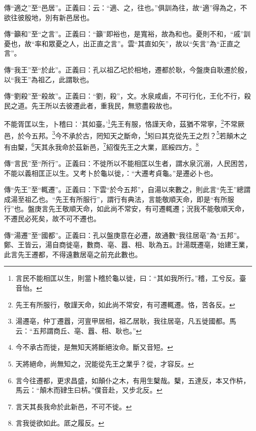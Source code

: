 {\noindent\zhuan{}\fzbyks 傳“適之”至“邑居”。正義曰：云：“適、之，往也。”俱訓為往，故“適”得為之，不欲往彼殷地，別有新邑居也。 \par}

{\noindent\zhuan{}\fzbyks 傳“籲和”至“之言”。正義曰：“籲”即裕也，是寬裕，故為和也。憂則不和，“戚”訓憂也，故“率和眾憂之人，出正直之言”。雲“其直如矢”，故以“矢言”為“正直之言”。 \par}

{\noindent\zhuan{}\fzbyks 傳“我王”至“於此”。正義曰：孔以祖乙圮於相地，遷都於耿，今盤庚自耿遷於殷，以“我王”為祖乙，此謂耿也。 \par}

{\noindent\zhuan{}\fzbyks 傳“劉殺”至“殺故”。正義曰：“劉，殺”，文。水泉咸鹵，不可行化，王化不行，殺民之道。先王所以去彼遷此者，重我民，無慾盡殺故也。 \par}

不能胥匡以生，卜稽曰：‘其如臺。’\footnote{言民不能相匡以生，則當卜稽於龜以徙，曰：“其如我所行。”稽，工兮反。臺音怡。}先王有服，恪謹天命，茲猶不常寧，\footnote{先王有所服行，敬謹天命，如此尚不常安，有可遷輒遷。恪，苦各反。}不常厥邑，於今五邦。\footnote{湯遷亳，仲丁遷囂，河亶甲居相，祖乙居耿，我往居亳，凡五徙國都。馬云：“五邦謂商丘、亳、囂、相、耿也。”}今不承於古，罔知天之斷命，\footnote{今不承古而徙，是無知天將斷絕汝命。斷又音短。}矧曰其克從先王之烈？\footnote{天將絕命，尚無知之，況能從先王之業乎？從，才容反。}若顛木之有由櫱，\footnote{言今往遷都，更求昌盛，如顛仆之木，有用生櫱哉。櫱，五達反，本又作枿，馬云：“顛木而肄生曰枿。”僕音赴，又步北反。}天其永我命於茲新邑，\footnote{言天其長我命於此新邑，不可不徙。}紹復先王之大業，厎綏四方。\footnote{言我徙欲如此。厎之履反。}

{\noindent\zhuan{}\fzbyks 傳“言民”至“所行”。正義曰：不徙所以不能相匡以生者，謂水泉沉溺，人民困苦，不能以義相匡正以生。又考卜於龜以徙，：“大遷考貞龜。”是遷必卜也。 \par}

{\noindent\zhuan{}\fzbyks 傳“先王”至“輒遷”。正義曰：下雲“於今五邦”，自湯以來數之，則此言“先王”總謂成湯至祖乙也。“先王有所服行”，謂行有典法，言能敬順天命，即是“有所服行”也。盤庚言先王敬順天命，如此尚不常安，有可遷輒遷；況我不能敬順天命，不遷民必死矣，故不可不遷也。 \par}

{\noindent\zhuan{}\fzbyks 傳“湯遷”至“國都”。正義曰：孔以盤庚意在必遷，故通數“我往居亳”為“五邦”。鄭、王皆云，湯自商徙亳，數商、亳、囂、相、耿為五。計湯既遷亳，始建王業，此言先王遷都，不得遠數居亳之前充此數也。 \par}

